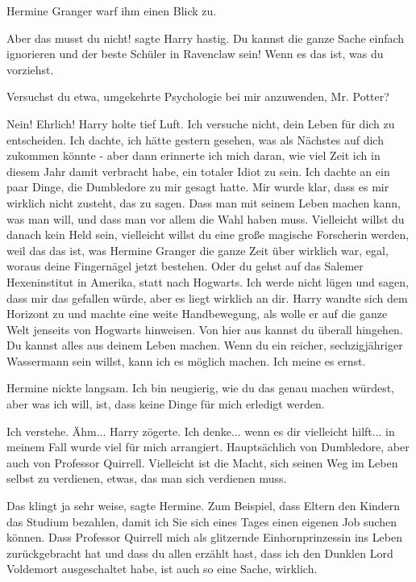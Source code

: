 Hermine Granger warf ihm einen Blick zu.

\glqq{}Aber das musst du nicht!\grqq{} sagte Harry hastig. \glqq{}Du kannst die
ganze Sache einfach ignorieren und der beste Schüler in Ravenclaw sein! Wenn es
das ist, was du vorziehst.\grqq{}

\glqq{}Versuchst du etwa, umgekehrte Psychologie bei mir anzuwenden, Mr. Potter?\grqq{}

\glqq{}Nein! Ehrlich!\grqq{} Harry holte tief Luft. \glqq{}Ich versuche nicht,
dein Leben für dich zu entscheiden. Ich dachte, ich hätte gestern gesehen, was
als Nächstes auf dich zukommen könnte - aber dann erinnerte ich mich daran, wie
viel Zeit ich in diesem Jahr damit verbracht habe, ein totaler Idiot zu sein.
Ich dachte an ein paar Dinge, die Dumbledore zu mir gesagt hatte. Mir wurde
klar, dass es mir wirklich nicht zusteht, das zu sagen. Dass man mit seinem
Leben machen kann, was man will, und dass man vor allem die Wahl haben muss.
Vielleicht willst du danach kein Held sein, vielleicht willst du eine große
magische Forscherin werden, weil das das ist, was Hermine Granger die ganze Zeit
über wirklich war, egal, woraus deine Fingernägel jetzt bestehen. Oder du gehst
auf das Salemer Hexeninstitut in Amerika, statt nach Hogwarts. Ich werde nicht
lügen und sagen, dass mir das gefallen würde, aber es liegt wirklich an
dir.\grqq{} Harry wandte sich dem Horizont zu und machte eine weite
Handbewegung, als wolle er auf die ganze Welt jenseits von Hogwarts hinweisen.
\glqq{}Von hier aus kannst du überall hingehen. Du kannst alles aus deinem Leben
machen. Wenn du ein reicher, sechzigjähriger Wassermann sein willst, kann ich es
möglich machen. Ich meine es ernst.\grqq{}

Hermine nickte langsam. \glqq{}Ich bin neugierig, wie du das genau machen
würdest, aber was ich will, ist, dass keine Dinge für mich erledigt
werden.\grqq{}

\glqq{}Ich verstehe. Ähm...\grqq{} Harry zögerte. \glqq{}Ich denke... wenn es dir
vielleicht hilft... in meinem Fall wurde viel für mich arrangiert. Hauptsächlich
von Dumbledore, aber auch von Professor Quirrell. Vielleicht ist die Macht, sich
seinen Weg im Leben selbst zu verdienen, etwas, das man sich verdienen
muss.\grqq{}

\glqq{}Das klingt ja sehr weise\grqq{}, sagte Hermine. \glqq{}Zum Beispiel, dass
Eltern den Kindern das Studium bezahlen, damit ich Sie sich eines Tages einen
eigenen Job suchen können. Dass Professor Quirrell mich als glitzernde
Einhornprinzessin ins Leben zurückgebracht hat und dass du allen erzählt hast,
dass ich den Dunklen Lord Voldemort ausgeschaltet habe, ist auch so eine Sache,
wirklich.\grqq{}

